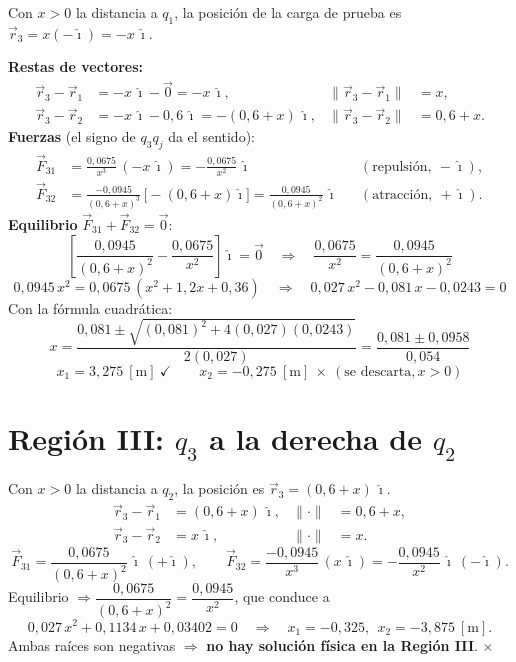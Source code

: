 \documentclass[12pt,letterpaper]{article}
\begin{document}
Con $x>0$ la distancia a $q_1$, la posici\'on de la carga de prueba es $\vec r_3 = x(-\hat\imath)=-x\,\hat\imath$.

\noindent\textbf{Restas de vectores:}
\begin{align*}
    \vec r_3-\vec r_1 &= -x\,\hat\imath-\vec 0 = -x\,\hat\imath, & \lVert\vec r_3-\vec r_1\rVert &= x,\\
    \vec r_3-\vec r_2 &= -x\,\hat\imath-0{,}6\,\hat\imath = -(0{,}6+x)\,\hat\imath, & \lVert\vec r_3-\vec r_2\rVert &= 0{,}6+x.
\end{align*}
\noindent\textbf{Fuerzas} (el signo de $q_3q_j$ da el sentido):
\begin{align*}
    \vec F_{31} &= \frac{0{,}0675}{x^{3}}\,(-x\,\hat\imath) = -\frac{0{,}0675}{x^{2}}\,\hat\imath
        &&(\text{repulsi\'on},\ -\hat\imath),\\[2pt]
    \vec F_{32} &= \frac{-0{,}0945}{(0{,}6+x)^{3}}\,\big[-(0{,}6+x)\hat\imath\big] = \frac{0{,}0945}{(0{,}6+x)^{2}}\,\hat\imath
        &&(\text{atracci\'on},\ +\hat\imath).
\end{align*}
\noindent\textbf{Equilibrio} $\vec F_{31}+\vec F_{32}=\vec 0$:
\[
    \left[\frac{0{,}0945}{(0{,}6+x)^{2}}-\frac{0{,}0675}{x^{2}}\right]\hat\imath = \vec 0
    \quad\Longrightarrow\quad
    \frac{0{,}0675}{x^{2}} = \frac{0{,}0945}{(0{,}6+x)^{2}}
\]
\[
    0{,}0945\,x^{2} = 0{,}0675\,(x^{2}+1{,}2x+0{,}36)
    \quad\Longrightarrow\quad
    \boxed{0{,}027\,x^{2} - 0{,}081\,x - 0{,}0243 = 0}
\]
Con la f\'ormula cuadr\'atica:
\[
    x = \frac{0{,}081 \pm \sqrt{(0{,}081)^2+4(0{,}027)(0{,}0243)}}{2(0{,}027)}
      = \frac{0{,}081 \pm 0{,}0958}{0{,}054}
\]
\[
    x_1 = 3{,}275\ [\text{m}]\ \checkmark \qquad
    x_2 = -0{,}275\ [\text{m}]\ \times\ (\text{se descarta}, x>0)
\]

\section*{Regi\'on III: $q_3$ a la derecha de $q_2$}

Con $x>0$ la distancia a $q_2$, la posici\'on es $\vec r_3=(0{,}6+x)\,\hat\imath$.
\begin{align*}
    \vec r_3-\vec r_1 &= (0{,}6+x)\,\hat\imath, & \lVert\cdot\rVert &= 0{,}6+x,\\
    \vec r_3-\vec r_2 &= x\,\hat\imath, & \lVert\cdot\rVert &= x.
\end{align*}
\[
    \vec F_{31} = \frac{0{,}0675}{(0{,}6+x)^{2}}\,\hat\imath\ (+\hat\imath),\qquad
    \vec F_{32} = \frac{-0{,}0945}{x^{3}}\,(x\,\hat\imath) = -\frac{0{,}0945}{x^{2}}\,\hat\imath\ (-\hat\imath).
\]
Equilibrio $\Rightarrow \dfrac{0{,}0675}{(0{,}6+x)^{2}}=\dfrac{0{,}0945}{x^{2}}$, que conduce a
\[
    0{,}027\,x^{2} + 0{,}1134\,x + 0{,}03402 = 0
    \quad\Longrightarrow\quad
    x_1 = -0{,}325,\ \ x_2 = -3{,}875\ [\text{m}].
\]
Ambas ra\'ices son negativas $\Rightarrow$ \textbf{no hay soluci\'on f\'isica en la Regi\'on III}. $\times$
\end{document}
